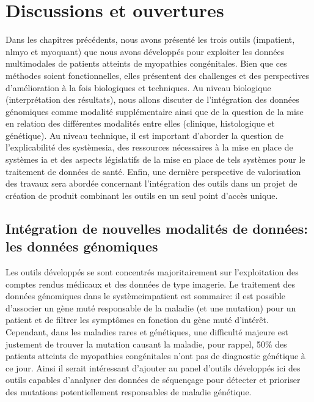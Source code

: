 \chapter{Discussions et ouvertures}
Dans les chapitres précédents, nous avons présenté les trois outils (\gls{impatient}, \gls{nlmyo} et \gls{myoquant}) que nous avons développés pour exploiter les données multimodales de patients atteints de myopathies congénitales. Bien que ces méthodes soient fonctionnelles, elles présentent des challenges et des perspectives d'amélioration à la fois biologiques et techniques. Au niveau biologique (interprétation des résultats), nous allons discuter de l'intégration des données génomiques comme modalité supplémentaire ainsi que de la question de la mise en relation des différentes modalités entre elles (clinique, histologique et génétique). Au niveau technique, il est important d'aborder la question de l'explicabilité des systèmes\gls{ia}, des ressources nécessaires à la mise en place de systèmes \gls{ia} et des aspects législatifs de la mise en place de tels systèmes pour le traitement de données de santé. Enfin, une dernière perspective de valorisation des travaux sera abordée concernant l'intégration des outils dans un projet de création de produit combinant les outils en un seul point d'accès unique.

\section{Intégration de nouvelles modalités de données: les données génomiques}
Les outils développés se sont concentrés majoritairement sur l'exploitation des comptes rendus médicaux et des données de type imagerie. Le traitement des données génomiques dans le système\gls{impatient} est sommaire: il est possible d'associer un gène muté responsable de la maladie (et une mutation) pour un patient et de filtrer les symptômes en fonction du gène muté d'intérêt. Cependant, dans les maladies rares et génétiques, une difficulté majeure est justement de trouver la mutation causant la maladie, pour rappel, 50\% des patients atteints de myopathies congénitales n'ont pas de diagnostic génétique à ce jour. Ainsi il serait intéressant d'ajouter au panel d'outils développés ici des outils capables d'analyser des données de séquençage pour détecter et prioriser des mutations potentiellement responsables de maladie génétique. 

